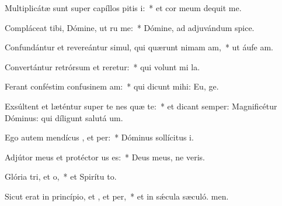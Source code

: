 \item Multiplicátæ sunt super capíllos pitis i:~* et cor meum dequit me.
\item Compláceat tibi, Dómine, ut ru me:~* Dómine, ad adjuvándum  spice.
\item Confundántur et revereántur simul, qui quærunt nimam am,~* ut áufe am.
\item Convertántur retrórsum et reretur:~* qui volunt mi la.
\item Ferant conféstim confusinem am:~* qui dicunt mihi: Eu, ge.
\item Exsúltent et læténtur super te nes quæ te:~* et dicant semper: Magnificétur Dóminus: qui díligunt salutá um.
\item Ego autem mendícus , et per:~* Dóminus sollícitus  i.
\item Adjútor meus et protéctor us  es:~* Deus meus, ne veris.
\item Glória tri, et o,~* et Spirítu to.
\item Sicut erat in princípio, et , et per,~* et in sǽcula sæculó. men.
